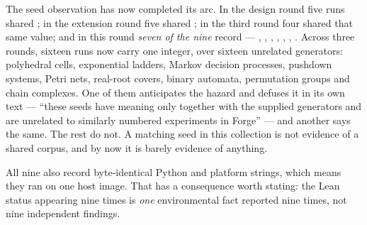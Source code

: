 The seed observation has now completed its arc. In the design round five runs
shared ; in the extension round five shared ; in
the third round four shared that same value; and in this round \emph{seven of
the nine} record  --- , , , ,
, , . Across three rounds, sixteen runs now carry one
integer, over sixteen unrelated generators: polyhedral cells, exponential
ladders, Markov decision processes, pushdown systems, Petri nets, real-root
covers, binary automata, permutation groups and chain complexes. One of them
anticipates the hazard and defuses it in its own text --- ``these seeds have
meaning only together with the supplied generators and are unrelated to
similarly numbered experiments in Forge'' --- and another says the same. The
rest do not. A matching seed in this collection is not evidence of a shared
corpus, and by now it is barely evidence of anything.

All nine also record byte-identical Python and platform strings, which means
they ran on one host image. That has a consequence worth stating: the
 Lean status appearing nine times is \emph{one} environmental
fact reported nine times, not nine independent findings.

